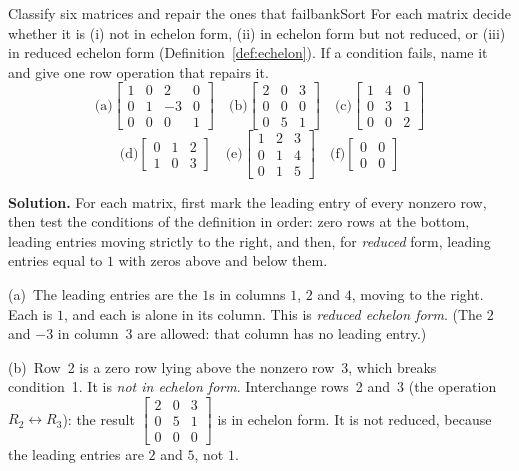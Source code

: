 \documentclass[11pt]{article}
\begin{document}
\begin{exmp}{Classify six matrices and repair the ones that fail}{bankSort}
For each matrix decide whether it is (i) not in echelon form, (ii) in echelon form but not reduced, or (iii) in reduced echelon form (Definition~\ref{def:echelon}). If a condition fails, name it and give one row operation that repairs it.
\[
\text{(a)}\begin{bmatrix}1&0&2&0\\0&1&-3&0\\0&0&0&1\end{bmatrix}\quad
\text{(b)}\begin{bmatrix}2&0&3\\0&0&0\\0&5&1\end{bmatrix}\quad
\text{(c)}\begin{bmatrix}1&4&0\\0&3&1\\0&0&2\end{bmatrix}
\]
\[
\text{(d)}\begin{bmatrix}0&1&2\\1&0&3\end{bmatrix}\quad
\text{(e)}\begin{bmatrix}1&2&3\\0&1&4\\0&1&5\end{bmatrix}\quad
\text{(f)}\begin{bmatrix}0&0\\0&0\end{bmatrix}
\]

\textbf{Solution.} For each matrix, first mark the leading entry of every nonzero row, then test the conditions of the definition in order: zero rows at the bottom, leading entries moving strictly to the right, and then, for \emph{reduced} form, leading entries equal to $1$ with zeros above and below them.

(a)~The leading entries are the $1$s in columns $1$, $2$ and $4$, moving to the right. Each is $1$, and each is alone in its column. This is \emph{reduced echelon form}. (The $2$ and $-3$ in column~3 are allowed: that column has no leading entry.)

(b)~Row~2 is a zero row lying above the nonzero row~3, which breaks condition~1. It is \emph{not in echelon form}. Interchange rows~2 and~3 (the operation $R_2\leftrightarrow R_3$): the result $\begin{bmatrix}2&0&3\\0&5&1\\0&0&0\end{bmatrix}$ is in echelon form. It is not reduced, because the leading entries are $2$ and $5$, not $1$.


\end{exmp}
\end{document}
